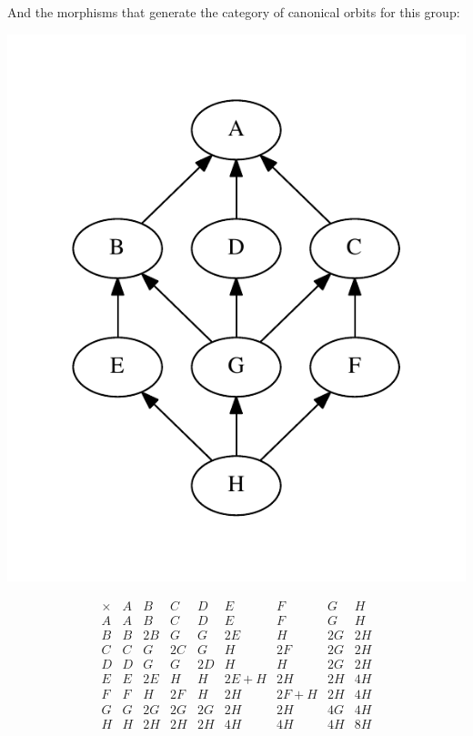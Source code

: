 \documentclass[11pt,oneside]{article}
\newcommand{\thinplus}{\!+\!}
\begin{document}
And the morphisms that generate the category of canonical orbits for this
group:
\begin{center}
\includegraphics[width=0.4\columnwidth]{subgroups_d8.pdf} 
\end{center}




$$
\begin{array}{r|rrrrrrrr}
\times & A & B & C & D & E & F & G & H \\
\hline
A & A & B & C & D & E & F & G & H \\
B & B & 2B & G & G & 2E & H & 2G & 2H \\
C & C & G & 2C & G & H & 2F & 2G & 2H \\
D & D & G & G & 2D & H & H & 2G & 2H \\
E & E & 2E & H & H & 2E\thinplus H & 2H & 2H & 4H \\
F & F & H & 2F & H & 2H & 2F\thinplus H & 2H & 4H \\
G & G & 2G & 2G & 2G & 2H & 2H & 4G & 4H \\
H & H & 2H & 2H & 2H & 4H & 4H & 4H & 8H \\
\end{array}
$$
\end{document}
